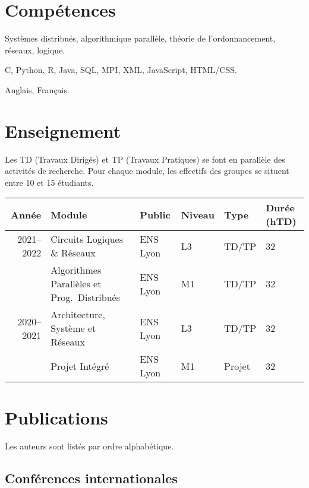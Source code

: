 \documentclass[12pt]{article}
\newcounter{cvitems}
\newcommand{\cvitem}[2]{\item[#1] #2}
\begin{document}
\section*{Compétences}

\begin{cvitems}
  \cvitem{Académiques}{Systèmes distribués, algorithmique parallèle, théorie de
  l'ordonnancement, réseaux, logique.}

  \cvitem{Techniques}{C, Python, R, Java, SQL, MPI, XML, JavaScript, HTML/CSS.}

  \cvitem{Linguistiques}{Anglais, Français.}
\end{cvitems}

\section*{Enseignement}

Les TD (Travaux Dirigés) et TP (Travaux Pratiques) se font en parallèle des activités de recherche.  
Pour chaque module, les effectifs des groupes se situent entre 10 et 15 étudiants.

\begin{center}
  \footnotesize
  \begin{tabularx}{\textwidth}{rXllll}
    \toprule
    Année & Module & Public & Niveau & Type & Durée (hTD) \tabularnewline
    \midrule
    2021--2022 & Circuits Logiques \& Réseaux & ENS Lyon & L3 & TD/TP & 32 \tabularnewline
    & Algorithmes Parallèles et Prog.\ Distribués & ENS Lyon & M1 & TD/TP & 32 \tabularnewline
    \midrule
    2020--2021 & Architecture, Système et Réseaux & ENS Lyon & L3 & TD/TP & 32 \tabularnewline
    & Projet Intégré & ENS Lyon & M1 & Projet & 32 \tabularnewline
    \bottomrule
  \end{tabularx}
\end{center}

\section*{Publications}

Les auteurs sont listés par ordre alphabétique.

\nocite{*}

\newcommand{\showbib}[1]{%
  \begin{otherlanguage}{english}
    \printbibliography[heading=none,keyword={#1}]
  \end{otherlanguage}}

\subsection*{Conférences internationales}
\end{document}
